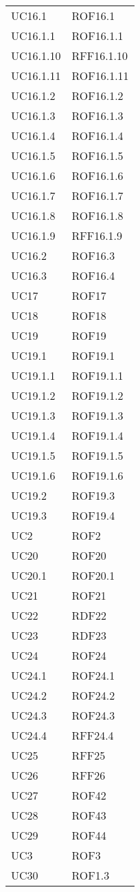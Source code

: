 \begin{longtable}{p{2.5cm}!{\VRule[1pt]}p{2.5cm}}
	UC16.1 & ROF16.1\\
	UC16.1.1 & ROF16.1.1\\
	UC16.1.10 & RFF16.1.10\\
	UC16.1.11 & ROF16.1.11\\
	UC16.1.2 & ROF16.1.2\\
	UC16.1.3 & ROF16.1.3\\
	UC16.1.4 & ROF16.1.4\\
	UC16.1.5 & ROF16.1.5\\
	UC16.1.6 & ROF16.1.6\\
	UC16.1.7 & ROF16.1.7\\
	UC16.1.8 & ROF16.1.8\\
	UC16.1.9 & RFF16.1.9\\
	UC16.2 & ROF16.3\\
	UC16.3 & ROF16.4\\
	UC17 & ROF17\\
	UC18 & ROF18\\
	UC19 & ROF19\\
	UC19.1 & ROF19.1\\
	UC19.1.1 & ROF19.1.1\\
	UC19.1.2 & ROF19.1.2\\
	UC19.1.3 & ROF19.1.3\\
	UC19.1.4 & ROF19.1.4\\
	UC19.1.5 & ROF19.1.5\\
	UC19.1.6 & ROF19.1.6\\
	UC19.2 & ROF19.3\\
	UC19.3 & ROF19.4\\
	UC2 & ROF2\\
	UC20 & ROF20\\
	UC20.1 & ROF20.1\\
	UC21 & ROF21\\
	UC22 & RDF22\\
	UC23 & RDF23\\
	UC24 & ROF24\\
	UC24.1 & ROF24.1\\
	UC24.2 & ROF24.2\\
	UC24.3 & ROF24.3\\
	UC24.4 & RFF24.4\\
	UC25 & RFF25\\
	UC26 & RFF26\\
	UC27 & ROF42\\
	UC28 & ROF43\\
	UC29 & ROF44\\
	UC3 & ROF3\\
	UC30 & ROF1.3\\

\end{longtable}
